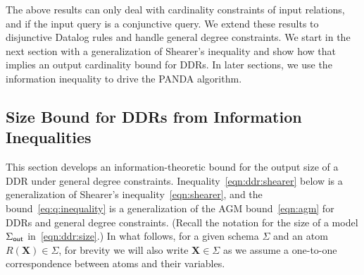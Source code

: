 \documentclass[10pt,a4paper]{article}
\newcommand{\out}{\text{\sf out}}
\newcommand{\panda}{\textsf{PANDA}\xspace}
\begin{document}
The above results can only deal with cardinality constraints of input relations, and if the
input query is a conjunctive query. We extend these results to disjunctive Datalog rules and
handle general degree constraints. We start in the next section with a generalization of
Shearer's inequality and show how that implies an output cardinality bound for DDRs. In
later sections, we use the information inequality to drive the \panda algorithm.

\subsection{Size Bound for DDRs from Information Inequalities}
\label{subsec:upperbound}

This section develops an information-theoretic bound for the output size of a DDR under
general degree constraints. Inequality~\eqref{eqn:ddr:shearer} below is a generalization of
Shearer's inequality~\eqref{eqn:shearer}, and the bound~\eqref{eq:q:inequality} is a
generalization of the AGM bound~\eqref{eqn:agm} for DDRs and general degree constraints. (Recall
the notation for the size of a model $\Sigma_{\out}$ in~\eqref{eqn:ddr:size}.) In what
follows, for a given schema $\Sigma$ and an atom $R(\bm X) \in \Sigma$, for brevity we will
also write $\bm X \in \Sigma$ as we assume a one-to-one correspondence between atoms and
their variables.
\end{document}
